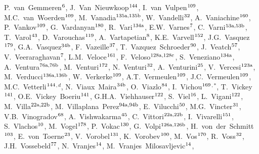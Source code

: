 \begin{flushleft}
P.~van~Gemmeren$^\textrm{\scriptsize 6}$,
J.~Van~Nieuwkoop$^\textrm{\scriptsize 144}$,
I.~van~Vulpen$^\textrm{\scriptsize 109}$,
M.C.~van~Woerden$^\textrm{\scriptsize 109}$,
M.~Vanadia$^\textrm{\scriptsize 135a,135b}$,
W.~Vandelli$^\textrm{\scriptsize 32}$,
A.~Vaniachine$^\textrm{\scriptsize 160}$,
P.~Vankov$^\textrm{\scriptsize 109}$,
G.~Vardanyan$^\textrm{\scriptsize 180}$,
R.~Vari$^\textrm{\scriptsize 134a}$,
E.W.~Varnes$^\textrm{\scriptsize 7}$,
C.~Varni$^\textrm{\scriptsize 53a,53b}$,
T.~Varol$^\textrm{\scriptsize 43}$,
D.~Varouchas$^\textrm{\scriptsize 119}$,
A.~Vartapetian$^\textrm{\scriptsize 8}$,
K.E.~Varvell$^\textrm{\scriptsize 152}$,
J.G.~Vasquez$^\textrm{\scriptsize 179}$,
G.A.~Vasquez$^\textrm{\scriptsize 34b}$,
F.~Vazeille$^\textrm{\scriptsize 37}$,
T.~Vazquez~Schroeder$^\textrm{\scriptsize 90}$,
J.~Veatch$^\textrm{\scriptsize 57}$,
V.~Veeraraghavan$^\textrm{\scriptsize 7}$,
L.M.~Veloce$^\textrm{\scriptsize 161}$,
F.~Veloso$^\textrm{\scriptsize 128a,128c}$,
S.~Veneziano$^\textrm{\scriptsize 134a}$,
A.~Ventura$^\textrm{\scriptsize 76a,76b}$,
M.~Venturi$^\textrm{\scriptsize 172}$,
N.~Venturi$^\textrm{\scriptsize 32}$,
A.~Venturini$^\textrm{\scriptsize 25}$,
V.~Vercesi$^\textrm{\scriptsize 123a}$,
M.~Verducci$^\textrm{\scriptsize 136a,136b}$,
W.~Verkerke$^\textrm{\scriptsize 109}$,
A.T.~Vermeulen$^\textrm{\scriptsize 109}$,
J.C.~Vermeulen$^\textrm{\scriptsize 109}$,
M.C.~Vetterli$^\textrm{\scriptsize 144}$$^{,d}$,
N.~Viaux~Maira$^\textrm{\scriptsize 34b}$,
O.~Viazlo$^\textrm{\scriptsize 84}$,
I.~Vichou$^\textrm{\scriptsize 169}$$^{,*}$,
T.~Vickey$^\textrm{\scriptsize 141}$,
O.E.~Vickey~Boeriu$^\textrm{\scriptsize 141}$,
G.H.A.~Viehhauser$^\textrm{\scriptsize 122}$,
S.~Viel$^\textrm{\scriptsize 16}$,
L.~Vigani$^\textrm{\scriptsize 122}$,
M.~Villa$^\textrm{\scriptsize 22a,22b}$,
M.~Villaplana~Perez$^\textrm{\scriptsize 94a,94b}$,
E.~Vilucchi$^\textrm{\scriptsize 50}$,
M.G.~Vincter$^\textrm{\scriptsize 31}$,
V.B.~Vinogradov$^\textrm{\scriptsize 68}$,
A.~Vishwakarma$^\textrm{\scriptsize 45}$,
C.~Vittori$^\textrm{\scriptsize 22a,22b}$,
I.~Vivarelli$^\textrm{\scriptsize 151}$,
S.~Vlachos$^\textrm{\scriptsize 10}$,
M.~Vogel$^\textrm{\scriptsize 178}$,
P.~Vokac$^\textrm{\scriptsize 130}$,
G.~Volpi$^\textrm{\scriptsize 126a,126b}$,
H.~von~der~Schmitt$^\textrm{\scriptsize 103}$,
E.~von~Toerne$^\textrm{\scriptsize 23}$,
V.~Vorobel$^\textrm{\scriptsize 131}$,
K.~Vorobev$^\textrm{\scriptsize 100}$,
M.~Vos$^\textrm{\scriptsize 170}$,
R.~Voss$^\textrm{\scriptsize 32}$,
J.H.~Vossebeld$^\textrm{\scriptsize 77}$,
N.~Vranjes$^\textrm{\scriptsize 14}$,
M.~Vranjes~Milosavljevic$^\textrm{\scriptsize 14}$,

\end{flushleft}
